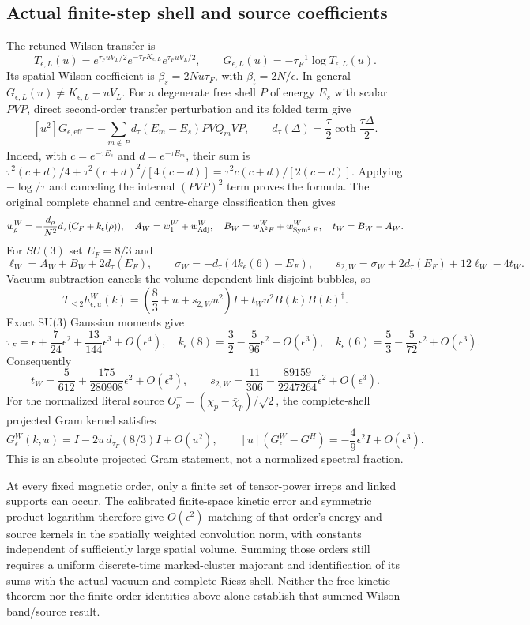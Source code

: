\subsection{Actual finite-step shell and source coefficients}
The retuned Wilson transfer is
\[
 T_{\epsilon,L}(u)=e^{\tau_FuV_L/2}e^{-\tau_FK_{\epsilon,L}}
                         e^{\tau_FuV_L/2},\qquad
 G_{\epsilon,L}(u)=-\tau_F^{-1}\log T_{\epsilon,L}(u).
\]
Its spatial Wilson coefficient is $\beta_s=2Nu\tau_F$, with
$\beta_t=2N/\epsilon$. In general $G_{\epsilon,L}(u)\ne K_{\epsilon,L}-uV_L$.
For a degenerate free shell $P$ of energy $E_s$ with scalar $PVP$, direct
second-order transfer perturbation and its folded term give
\[
 [u^2]G_{\epsilon,\mathrm{eff}}
 =-\sum_{m\notin P}d_\tau(E_m-E_s)PVQ_mVP,\qquad
 d_\tau(\Delta)=\frac\tau2\coth\frac{\tau\Delta}{2}.
\]
Indeed, with $c=e^{-\tau E_s}$ and $d=e^{-\tau E_m}$, their sum is
$\tau^2(c+d)/4+\tau^2(c+d)^2/[4(c-d)]
=\tau^2c(c+d)/[2(c-d)]$. Applying $-\log/\tau$ and canceling the internal
$(PVP)^2$ term proves the formula.
The original complete channel and centre-charge classification then gives
\[
 w_\rho^W=-\frac{d_\rho}{N^2}d_\tau(C_F+k_\epsilon(\rho)),\quad
 A_W=w_1^W+w_{\rm Adj}^W,\quad
 B_W=w_{\Lambda^2F}^W+w_{\operatorname{Sym}^2F}^W,\quad t_W=B_W-A_W.
\]
For $SU(3)$ set $E_F=8/3$ and
\[
 \ell_W=A_W+B_W+2d_\tau(E_F),\qquad
 \sigma_W=-d_\tau(4k_\epsilon(6)-E_F),\qquad
 s_{2,W}=\sigma_W+2d_\tau(E_F)+12\ell_W-4t_W.
\]
Vacuum subtraction cancels the volume-dependent link-disjoint bubbles, so
\[
 T_{\le2}h_{\epsilon,u}^W(k)
 =\left(\frac83+u+s_{2,W}u^2\right)I+t_Wu^2B(k)B(k)^\dagger.
\]
Exact SU(3) Gaussian moments give
\[
 \tau_F=\epsilon+\frac7{24}\epsilon^2+\frac{13}{144}\epsilon^3+O(\epsilon^4),
 \quad k_\epsilon(8)=\frac32-\frac5{96}\epsilon^2+O(\epsilon^3),
 \quad k_\epsilon(6)=\frac53-\frac5{72}\epsilon^2+O(\epsilon^3).
\]
Consequently
\[
 t_W=\frac5{612}+\frac{175}{280908}\epsilon^2+O(\epsilon^3),\qquad
 s_{2,W}=\frac{11}{306}-\frac{89159}{2247264}\epsilon^2+O(\epsilon^3).
\]
For the normalized literal source $O_p^-=(\chi_p-\bar\chi_p)/\sqrt2$, the
complete-shell projected Gram kernel satisfies
\[
 G_\epsilon^W(k,u)=I-2u\,d_{\tau_F}(8/3)I+O(u^2),\qquad
 [u](G_\epsilon^W-G^H)=-\frac49\epsilon^2I+O(\epsilon^3).
\]
This is an absolute projected Gram statement, not a normalized spectral fraction.

At every fixed magnetic order, only a finite set of tensor-power irreps and
linked supports can occur. The calibrated finite-space kinetic error and
symmetric product logarithm therefore give $O(\epsilon^2)$ matching of that
order's energy and source kernels in the spatially weighted convolution norm,
with constants independent of sufficiently large spatial volume. Summing those
orders still requires a uniform discrete-time marked-cluster majorant and
identification of its sums with the actual vacuum and complete Riesz shell.
Neither the free kinetic theorem nor the finite-order identities above alone
establish that summed Wilson-band/source result.
